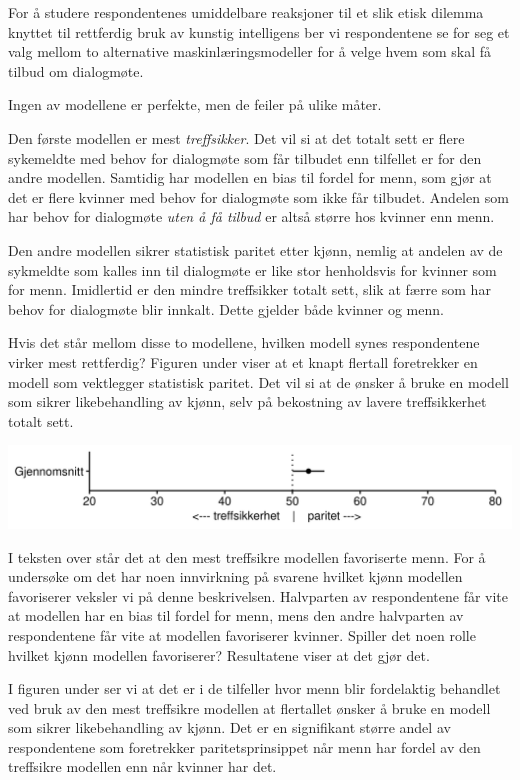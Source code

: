 \documentclass[
]{book}
\begin{document}
For å studere respondentenes umiddelbare reaksjoner til et slik etisk dilemma knyttet til rettferdig bruk av kunstig intelligens ber vi respondentene se for seg et valg mellom to alternative maskinlæringsmodeller for å velge hvem som skal få tilbud om dialogmøte.

Ingen av modellene er perfekte, men de feiler på ulike måter.

Den første modellen er mest \emph{treffsikker}.
Det vil si at det totalt sett er flere sykemeldte med behov for dialogmøte som får tilbudet enn tilfellet er for den andre modellen.
Samtidig har modellen en bias til fordel for menn, som gjør at det er flere kvinner med behov for dialogmøte som ikke får tilbudet.
Andelen som har behov for dialogmøte \emph{uten å få tilbud} er altså større hos kvinner enn menn.

Den andre modellen sikrer statistisk paritet etter kjønn, nemlig at andelen av de sykmeldte som kalles inn til dialogmøte er like stor henholdsvis for kvinner som for menn.
Imidlertid er den mindre treffsikker totalt sett, slik at færre som har behov for dialogmøte blir innkalt.
Dette gjelder både kvinner og menn.

Hvis det står mellom disse to modellene, hvilken modell synes respondentene virker mest rettferdig?
Figuren under viser at et knapt flertall foretrekker en modell som vektlegger statistisk paritet.
Det vil si at de ønsker å bruke en modell som sikrer likebehandling av kjønn, selv på bekostning av lavere treffsikkerhet totalt sett.

\includegraphics{figs/png/fig_parity_avg.png}

I teksten over står det at den mest treffsikre modellen favoriserte menn.
For å undersøke om det har noen innvirkning på svarene hvilket kjønn modellen favoriserer veksler vi på denne beskrivelsen.
Halvparten av respondentene får vite at modellen har en bias til fordel for menn, mens den andre halvparten av respondentene får vite at modellen favoriserer kvinner.
Spiller det noen rolle hvilket kjønn modellen favoriserer?
Resultatene viser at det gjør det.

I figuren under ser vi at det er i de tilfeller hvor menn blir fordelaktig behandlet ved bruk av den mest treffsikre modellen at flertallet ønsker å bruke en modell som sikrer likebehandling av kjønn.
Det er en signifikant større andel av respondentene som foretrekker paritetsprinsippet når menn har fordel av den treffsikre modellen enn når kvinner har det.
\end{document}
